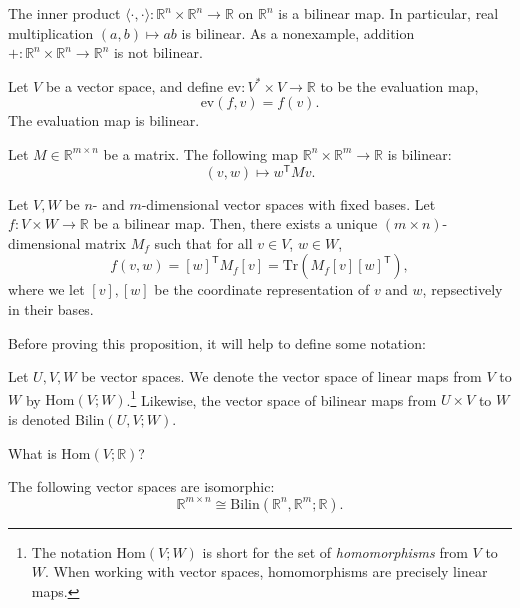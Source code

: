 \begin{example}
The inner product $\langle \cdot , \cdot \rangle : \mathbb{R}^n \times \mathbb{R}^n \to \mathbb{R}$ on $\mathbb{R}^n$ is a bilinear map. In particular, real multiplication $(a, b) \mapsto ab$ is bilinear. As a nonexample, addition $+ : \mathbb{R}^n \times \mathbb{R}^n \to \mathbb{R}^n$ is not bilinear.
\end{example}

\begin{example}
Let $V$ be a vector space, and define $\mathrm{ev}: V^* \times V \to \mathbb{R}$ to be the evaluation map,
\[\mathrm{ev}(f,v) = f(v).\]
The evaluation map is bilinear. 
\end{example}

\begin{example}
  Let $M \in \mathbb{R}^{m \times n}$ be a matrix. The following map $\mathbb{R}^n \times \mathbb{R}^m \to \mathbb{R}$ is bilinear:
  \[(v, w) \mapsto w^\mathsf{T} M v.\]
\end{example}
\begin{proposition} \label{bilin-mat-rep} Let $V, W$ be $n$- and $m$-dimensional vector spaces with fixed bases. Let $f : V \times W \to \mathbb{R}$ be a bilinear map. Then, there exists a unique $(m\times n)$-dimensional matrix $M_f$ such that for all $v \in V$,  $w \in W$,
  \[f(v,w) = [w]^\mathsf{T} M_f [v] = \mathrm{Tr}(M_f [v][w]^\mathsf{T}),\]
where we let $[v], [w]$ be the coordinate representation of $v$ and $w$, repsectively in their bases.
\end{proposition}

Before proving this proposition, it will help to define some notation:
\begin{definition}
  Let $U, V, W$ be vector spaces. We denote the vector space of linear maps from $V$ to $W$ by $\mathrm{Hom}(V;W)$.\footnote{The notation $\mathrm{Hom}(V;W)$ is short for the set of \emph{homomorphisms} from $V$ to $W$. When working with vector spaces, homomorphisms are precisely linear maps.} Likewise, the vector space of bilinear maps from $U \times V$ to $W$ is denoted $\mathrm{Bilin}(U,V; W)$.
\end{definition}

\begin{exercise} What is $\mathrm{Hom}(V;\mathbb{R})$?
\end{exercise}

\begin{corollary} \label{mat-bilin} The following vector spaces are isomorphic:
  \[\mathbb{R}^{m \times n} \cong \mathrm{Bilin}(\mathbb{R}^n, \mathbb{R}^m; \mathbb{R}).\]
\end{corollary}

